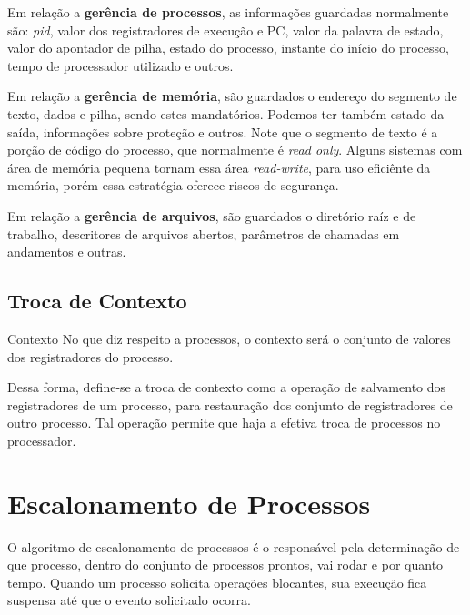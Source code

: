 Em relação a \textbf{gerência de processos}, as informações guardadas normalmente são: \textit{pid}, valor dos registradores de execução e PC, valor da palavra de estado, valor do apontador de pilha, estado do processo, instante do início do processo, tempo de processador utilizado e outros.

Em relação a \textbf{gerência de memória}, são guardados o endereço do segmento de texto, dados e pilha, sendo estes mandatórios. Podemos ter também estado da saída, informações sobre proteção e outros. Note que o segmento de texto é a porção de código do processo, que normalmente é \textit{read only}. Alguns sistemas com área de memória pequena tornam essa área \textit{read-write}, para uso eficiênte da memória, porém essa estratégia oferece riscos de segurança.

Em relação a \textbf{gerência de arquivos}, são guardados o diretório raíz e de trabalho, descritores de arquivos abertos, parâmetros de chamadas em andamentos e outras.




\subsection{Troca de Contexto}
\begin{definicao}{Contexto}
  No que diz respeito a processos, o contexto será o conjunto de valores dos registradores do processo.
\end{definicao}

Dessa forma, define-se a troca de contexto como a operação de salvamento dos registradores de um processo, para restauração dos conjunto de registradores de outro processo. Tal operação permite que haja a efetiva troca de processos no processador.




















\section{Escalonamento de Processos}
O algoritmo de escalonamento de processos é o responsável pela determinação de que processo, dentro do conjunto de processos prontos, vai rodar e por quanto tempo. Quando um processo solicita operações blocantes, sua execução fica suspensa até que o evento solicitado ocorra.

